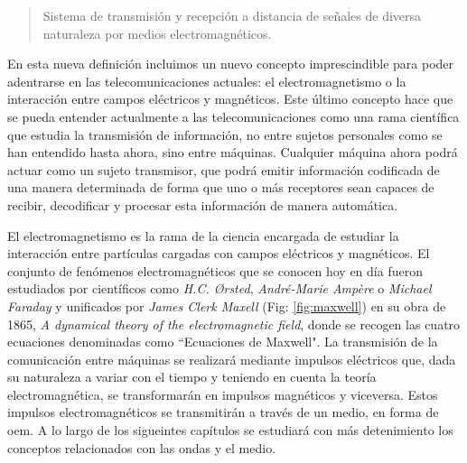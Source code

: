 \begin{quote}

\small Sistema de transmisión y recepción a distancia de señales de diversa naturaleza por medios electromagnéticos.

\end{quote}

\par En esta nueva definición incluimos un nuevo concepto imprescindible para poder adentrarse en las telecomunicaciones actuales: el electromagnetismo o la interacción entre campos eléctricos y magnéticos. Este último concepto hace que se pueda entender actualmente a las telecomunicaciones como una rama científica que estudia la transmisión de información, no entre sujetos personales como se han entendido hasta ahora, sino entre máquinas. Cualquier máquina  ahora podrá actuar como un sujeto transmisor, que podrá emitir información codificada de una manera determinada de forma que uno o más receptores sean capaces de recibir, decodificar y procesar esta información de manera automática.
\\
\par El electromagnetismo es la rama de la ciencia encargada de estudiar la interacción entre partículas cargadas con campos eléctricos y magnéticos. El conjunto de fenómenos electromagnéticos que se conocen hoy en día fueron estudiados por científicos como \textit{H.C. Ørsted}, \textit{André-Marie Ampère} o \textit{Michael Faraday} y unificados por \textit{James Clerk Maxell} (Fig: \ref{fig:maxwell}) en su obra de 1865, \textit{A dynamical theory of the electromagnetic field}, donde se recogen las cuatro ecuaciones denominadas como ``Ecuaciones de Maxwell". La transmisión de la comunicación entre máquinas se realizará mediante impulsos eléctricos que, dada su naturaleza a variar con el tiempo y teniendo en cuenta la teoría electromagnética, se transformarán en impulsos magnéticos y viceversa. Estos impulsos electromagnéticos se transmitirán a través de un medio, en forma de \gls{oem}. A lo largo de los sigueintes capítulos se estudiará con más detenimiento los conceptos relacionados con las ondas y el medio.

